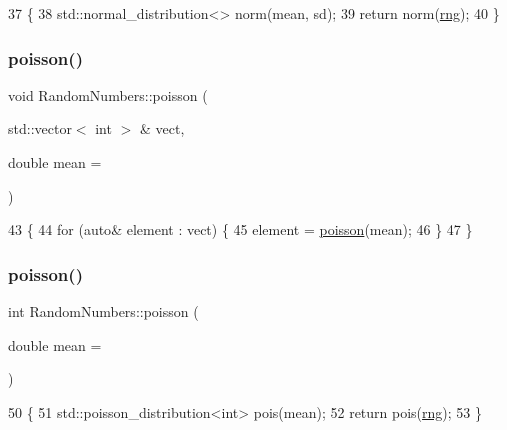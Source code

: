 \begin{DoxyCode}
37 \{
38     std::normal\_distribution<> norm(mean, sd);
39     \textcolor{keywordflow}{return} norm(\hyperlink{classRandomNumbers_a15ceee85d6d00de12ae76c90aaec2f14}{rng});
40 \}
\end{DoxyCode}
\mbox{\label{classRandomNumbers_a1195251686ad00cd782c9a91a44d983b}} 
\subsubsection{\texorpdfstring{poisson()}{poisson()}\hspace{0.1cm}{\footnotesize\ttfamily [1/2]}}
{\footnotesize\ttfamily void Random\+Numbers\+::poisson (\begin{DoxyParamCaption}\item[{std\+::vector$<$ int $>$ \&}]{vect,  }\item[{double}]{mean = {} }\end{DoxyParamCaption})}


\begin{DoxyCode}
43 \{
44     \textcolor{keywordflow}{for} (\textcolor{keyword}{auto}& element : vect) \{
45         element = \hyperlink{classRandomNumbers_a1195251686ad00cd782c9a91a44d983b}{poisson}(mean);
46     \}       
47 \}
\end{DoxyCode}
\mbox{\label{classRandomNumbers_ac5bd95dddabde62a74a0d871a66ce2f0}} 
\subsubsection{\texorpdfstring{poisson()}{poisson()}\hspace{0.1cm}{\footnotesize\ttfamily [2/2]}}
{\footnotesize\ttfamily int Random\+Numbers\+::poisson (\begin{DoxyParamCaption}\item[{double}]{mean = {} }\end{DoxyParamCaption})}


\begin{DoxyCode}
50 \{
51     std::poisson\_distribution<int> pois(mean);
52     \textcolor{keywordflow}{return} pois(\hyperlink{classRandomNumbers_a15ceee85d6d00de12ae76c90aaec2f14}{rng});
53 \}
\end{DoxyCode}
\mbox{\label{classRandomNumbers_a851aaa7e46922dc22ce984b21b474a4e}} 
